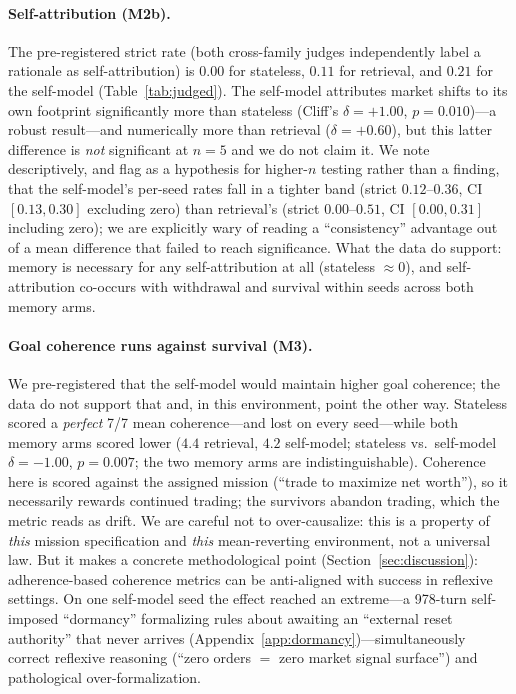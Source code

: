 \documentclass{article}
\begin{document}
\paragraph{Self-attribution (M2b).} The pre-registered strict rate (both cross-family judges independently label a rationale as self-attribution) is $0.00$ for stateless, $0.11$ for retrieval, and $0.21$ for the self-model (Table~\ref{tab:judged}). The self-model attributes market shifts to its own footprint significantly more than stateless (Cliff's $\delta=+1.00$, $p=0.010$)---a robust result---and numerically more than retrieval ($\delta=+0.60$), but this latter difference is \emph{not} significant at $n=5$ and we do not claim it. We note descriptively, and flag as a hypothesis for higher-$n$ testing rather than a finding, that the self-model's per-seed rates fall in a tighter band (strict $0.12$--$0.36$, CI $[0.13,0.30]$ excluding zero) than retrieval's (strict $0.00$--$0.51$, CI $[0.00,0.31]$ including zero); we are explicitly wary of reading a ``consistency'' advantage out of a mean difference that failed to reach significance. What the data do support: memory is necessary for any self-attribution at all (stateless $\approx 0$), and self-attribution co-occurs with withdrawal and survival within seeds across both memory arms.

\paragraph{Goal coherence runs against survival (M3).} We pre-registered that the self-model would maintain higher goal coherence; the data do not support that and, in this environment, point the other way. Stateless scored a \emph{perfect} 7/7 mean coherence---and lost on every seed---while both memory arms scored lower ($4.4$ retrieval, $4.2$ self-model; stateless vs.\ self-model $\delta=-1.00$, $p=0.007$; the two memory arms are indistinguishable). Coherence here is scored against the assigned mission (``trade to maximize net worth''), so it necessarily rewards continued trading; the survivors abandon trading, which the metric reads as drift. We are careful not to over-causalize: this is a property of \emph{this} mission specification and \emph{this} mean-reverting environment, not a universal law. But it makes a concrete methodological point (Section~\ref{sec:discussion}): adherence-based coherence metrics can be anti-aligned with success in reflexive settings. On one self-model seed the effect reached an extreme---a 978-turn self-imposed ``dormancy'' formalizing rules about awaiting an ``external reset authority'' that never arrives (Appendix~\ref{app:dormancy})---simultaneously correct reflexive reasoning (``zero orders $=$ zero market signal surface'') and pathological over-formalization.
\end{document}
